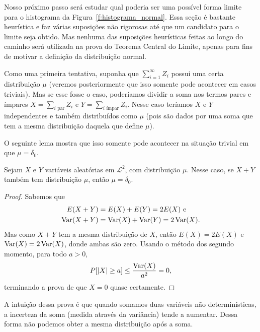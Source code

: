 Nosso próximo passo será estudar qual poderia ser uma possível forma limite para o histograma da Figura~\ref{f:histograma_normal}.
Essa seção é bastante heurística e faz várias suposições não rigorosas até que um candidato para o limite seja obtido.
Mas nenhuma das suposições heurísticas feitas ao longo do caminho será utilizada na prova do Teorema Central do Limite, apenas para fins de motivar a definição da distribuição normal.

Como uma primeira tentativa, suponha que $\sum_{i=1}^\infty Z_i$ possui uma certa distribuição $\mu$ (veremos posteriormente que isso somente pode acontecer em casos triviais).
Mas se esse fosse o caso, poderíamos dividir a soma nos termos pares e ímpares $X = \sum_{i \text{ par}} Z_i$ e $Y = \sum_{i \text{ ímpar}} Z_i$.
Nesse caso teríamos $X$ e $Y$ independentes e também distribuídos como $\mu$ (pois são dados por uma soma que tem a mesma distribuição daquela que define $\mu$).

O seguinte lema mostra que isso somente pode acontecer na situação trivial em que $\mu = \delta_0$.

\begin{lemma}
  Sejam $X$ e $Y$ variáveis aleatórias em $\mathcal{L}^2$, \iid com distribuição $\mu$.
  Nesse caso, se $X + Y$ também tem distribuição $\mu$, então $\mu = \delta_0$.
\end{lemma}

\begin{proof}
  Sabemos que
  \begin{equation}
    \begin{split}
      E(X + Y) & = E(X) + E(Y) = 2 E(X) \text{ e}\\
      \operatorname{Var}(X + Y) & = \operatorname{Var}(X) + \operatorname{Var}(Y) = 2 \operatorname{Var}(X).
    \end{split}
  \end{equation}
  Mas como $X + Y$ tem a mesma distribuição de $X$, então $E(X) = 2 E(X)$ e $\operatorname{Var}(X) = 2 \operatorname{Var}(X)$, donde ambas são zero.
  Usando o método dos segundo momento, para todo $a > 0$,
  \begin{equation}
    P[|X| \geq a] \leq \frac{\operatorname{Var}(X)}{a^2} = 0,
  \end{equation}
  terminando a prova de que $X = 0$ quase certamente.
\end{proof}

A intuição dessa prova é que quando somamos duas variáveis não determinísticas, a incerteza da soma (medida através da variância) tende a aumentar.
Dessa forma não podemos obter a mesma distribuição após a soma.

